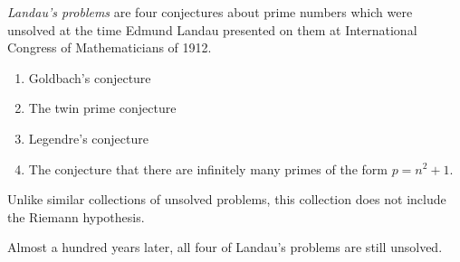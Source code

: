 \documentclass[12pt]{article}
\begin{document}
{\em Landau's problems} are four conjectures about prime numbers which were unsolved at the time Edmund Landau presented on them at International Congress of Mathematicians of 1912. 

\begin{enumerate}
\item Goldbach's conjecture
\item The twin prime conjecture
\item Legendre's conjecture
\item The conjecture that there are infinitely many primes of the form $p = n^2 + 1$.
\end{enumerate}

Unlike similar collections of unsolved problems, this collection does not include the Riemann hypothesis.

Almost a hundred years later, all four of Landau's problems are still unsolved.
\end{document}
